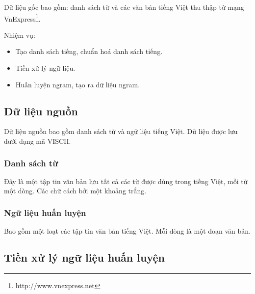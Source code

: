 \documentclass[a4paper,oneside,14pt]{extbook} %
\begin{document}
Dữ liệu gốc bao gồm: danh sách từ và các văn bản tiếng Việt thu thập
từ mạng VnExpress\footnote{http://www.vnexpress.net}.

Nhiệm vụ:
\begin{itemize}
\item Tạo danh sách tiếng, chuẩn hoá danh sách tiếng.
\item Tiền xử lý ngữ liệu.
\item Huấn luyện n\-gram, tạo ra dữ liệu n\-gram.
\end{itemize}


\subsection{Dữ liệu nguồn}
\label{sec:data-source}

Dữ liệu nguồn bao gồm danh sách từ và ngữ liệu tiếng Việt. Dữ liệu
được lưu dưới dạng mã VISCII. 
\subsubsection{Danh sách từ}

Đây là một tập tin văn bản lưu tất cả các từ được dùng trong tiếng
Việt, mỗi từ một dòng. Các chữ cách bởi một khoảng trắng.


\subsubsection{Ngữ liệu huấn luyện}

Bao gồm một loạt các tập tin văn bản tiếng Việt. Mỗi dòng là một đoạn
văn bản.






\subsection{Tiền xử lý ngữ liệu huấn luyện}
\label{sec:training-data-preprocessing}
\end{document}

